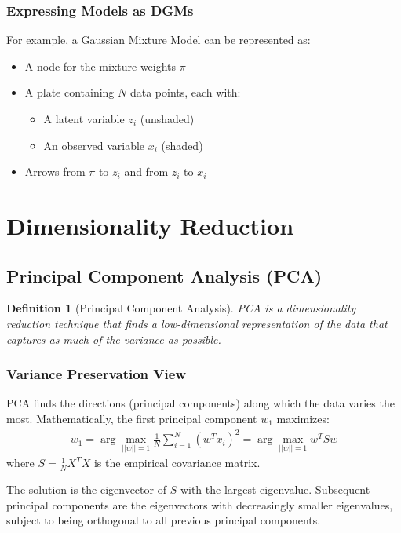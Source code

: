 \documentclass{article}
\newtheorem{definition}{Definition}
\begin{document}
\subsubsection{Expressing Models as DGMs}
For example, a Gaussian Mixture Model can be represented as:
\begin{itemize}
\item A node for the mixture weights $\pi$
\item A plate containing $N$ data points, each with:
  \begin{itemize}
  \item A latent variable $z_i$ (unshaded)
  \item An observed variable $x_i$ (shaded)
  \end{itemize}
\item Arrows from $\pi$ to $z_i$ and from $z_i$ to $x_i$
\end{itemize}

\section{Dimensionality Reduction}

\subsection{Principal Component Analysis (PCA)}
\begin{definition}[Principal Component Analysis]
PCA is a dimensionality reduction technique that finds a low-dimensional representation of the data that captures as much of the variance as possible.
\end{definition}

\subsubsection{Variance Preservation View}
PCA finds the directions (principal components) along which the data varies the most. Mathematically, the first principal component $w_1$ maximizes:
\begin{align}
w_1 = \arg\max_{||w||=1} \frac{1}{N}\sum_{i=1}^{N}(w^Tx_i)^2 = \arg\max_{||w||=1} w^TSw
\end{align}
where $S = \frac{1}{N}X^TX$ is the empirical covariance matrix.

The solution is the eigenvector of $S$ with the largest eigenvalue. Subsequent principal components are the eigenvectors with decreasingly smaller eigenvalues, subject to being orthogonal to all previous principal components.
\end{document}
